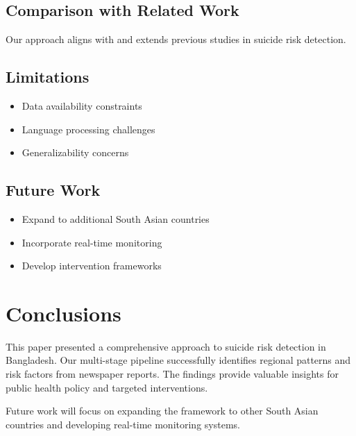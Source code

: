 \documentclass[12pt,a4paper]{article}
\begin{document}
\subsection{Comparison with Related Work}
Our approach aligns with and extends previous studies in suicide risk detection.

\subsection{Limitations}
\begin{itemize}
    \item Data availability constraints
    \item Language processing challenges
    \item Generalizability concerns
\end{itemize}

\subsection{Future Work}
\begin{itemize}
    \item Expand to additional South Asian countries
    \item Incorporate real-time monitoring
    \item Develop intervention frameworks
\end{itemize}

\section{Conclusions}

This paper presented a comprehensive approach to suicide risk detection in Bangladesh. Our multi-stage pipeline successfully identifies regional patterns and risk factors from newspaper reports. The findings provide valuable insights for public health policy and targeted interventions.

Future work will focus on expanding the framework to other South Asian countries and developing real-time monitoring systems.
\end{document}
